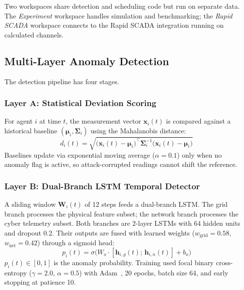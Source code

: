 \documentclass[conference,a4paper]{IEEEtran}
\begin{document}
Two workspaces share detection and scheduling code but run on separate data. The \textit{Experiment} workspace handles simulation and benchmarking; the \textit{Rapid SCADA} workspace connects to the Rapid SCADA integration running on calculated channels.

\subsection{Multi-Layer Anomaly Detection}

The detection pipeline has four stages.

\subsubsection{Layer A: Statistical Deviation Scoring}

For agent $i$ at time $t$, the measurement vector $\mathbf{x}_i(t)$ is compared against a historical baseline $(\boldsymbol{\mu}_i, \boldsymbol{\Sigma}_i)$ using the Mahalanobis distance:
\begin{equation}
d_i(t) = \sqrt{\bigl(\mathbf{x}_i(t) - \boldsymbol{\mu}_i\bigr)^\top \boldsymbol{\Sigma}_i^{-1} \bigl(\mathbf{x}_i(t) - \boldsymbol{\mu}_i\bigr)}
\label{eq:mahal}
\end{equation}
Baselines update via exponential moving average ($\alpha=0.1$) only when no anomaly flag is active, so attack-corrupted readings cannot shift the reference.

\subsubsection{Layer B: Dual-Branch LSTM Temporal Detector}

A sliding window $\mathbf{W}_i(t)$ of 12 steps feeds a dual-branch LSTM. The grid branch processes the physical feature subset; the network branch processes the cyber telemetry subset. Both branches are 2-layer LSTMs with 64 hidden units and dropout 0.2. Their outputs are fused with learned weights ($w_{\text{grid}}=0.58$, $w_{\text{net}}=0.42$) through a sigmoid head:
\begin{equation}
p_i(t) = \sigma\!\bigl(W_o \cdot [\mathbf{h}_{i,g}(t);\, \mathbf{h}_{i,n}(t)] + b_o\bigr)
\label{eq:lstm}
\end{equation}
$p_i(t) \in [0,1]$ is the anomaly probability. Training used focal binary cross-entropy ($\gamma=2.0$, $\alpha=0.5$) with Adam~\cite{b16}, 20 epochs, batch size 64, and early stopping at patience 10.
\end{document}
